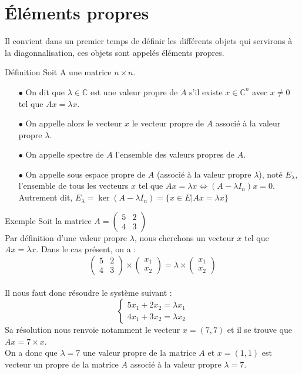 \section{Éléments propres}
Il convient dans un premier temps de définir les différents objets qui servirons à la diagonnalisation, ces objets sont appelés éléments propres.
\begin{bclogo}[couleur=blue!30,couleurBord=blue,arrondi=0.1,logo=\bcbook,ombre=true]{Définition}
Soit A une matrice $n\times n$.
\begin{itemize}
    \item[$\bullet$] On dit que $\lambda\in\mathbb{C}$ est une valeur propre de $A$ s'il existe $x\in\mathbb{C}^{n}$ avec $x\neq 0$ tel que $Ax = \lambda x$.
    \item[$\bullet$] On appelle alors le vecteur $x$ le vecteur propre de $A$ associé à la valeur propre $\lambda$.
    \item[$\bullet$] On appelle spectre de $A$ l'ensemble des valeurs propres de $A$.
    \item[$\bullet$] On appelle sous espace propre de $A$ (associé à la valeur propre $\lambda$), noté $E_{\lambda}$, l'ensemble de tous les vecteurs $x$ tel que
$Ax=\lambda x \Leftrightarrow (A-\lambda I_n)x=0$.\\
Autrement dit, $E_{\lambda}=\ker(A-\lambda I_n)=\{x\in E | Ax=\lambda x\}$\\
\end{itemize}
\end{bclogo}
\begin{bclogo}[logo=\bccrayon,noborder=true,barre=snake]{Exemple}
Soit la matrice $A=\begin{pmatrix}
5 & 2 \\
4 & 3
\end{pmatrix}$\\
Par définition d'une valeur propre $\lambda$, nous cherchons un vecteur $x$ tel que $Ax=\lambda x$.
Dans le cas présent, on a :\\
$$\begin{pmatrix} 5 & 2\\ 4 & 3\end{pmatrix}\times\begin{pmatrix}x_1\\x_2\end{pmatrix}=\lambda\times\begin{pmatrix}x_1\\x_2\end{pmatrix}$$\\
Il nous faut donc résoudre le système suivant :\\
$$\begin{cases}5x_1+2x_2=\lambda x_1\\4x_1 + 3x_2=\lambda x_2\end{cases}$$
Sa résolution nous renvoie notamment le vecteur $x=(7,7)$ et il se trouve que $Ax=7\times x$.\\
On a donc que $\lambda = 7$ une valeur propre de la matrice $A$ et $x=(1,1)$ est vecteur un propre de la matrice $A$ associé à la valeur propre $\lambda = 7$.\\
\end{bclogo}
